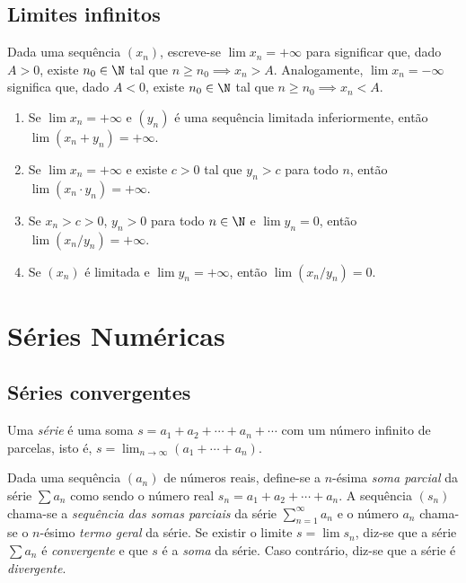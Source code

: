 \documentclass{article}
\begin{document}
\subsection{Limites infinitos}

\begin{defn}
    Dada uma sequência \((x_n)\), escreve-se \(\lim x_n = +\infty\) para significar que, dado \(A > 0\), existe \(n_0 \in \N\) tal que \(n \geq n_0 \implies x_n > A\).
    Analogamente, \(\lim x_n = -\infty\) significa que, dado \(A < 0\), existe \(n_0 \in \N\) tal que \(n \geq n_0 \implies x_n < A\).
\end{defn}

\begin{thm}
    \begin{enumerate}
        \item [(i)] Se \(\lim x_n = +\infty\) e \((y_n)\) é uma sequência limitada inferiormente, então \(\lim (x_n + y_n) = +\infty\).
        \item [(ii)] Se \(\lim x_n = +\infty\) e existe \(c > 0\) tal que \(y_n > c\) para todo \(n\), então \(\lim (x_n \cdot y_n) = +\infty\).
        \item [(iii)] Se \(x_n > c > 0\), \(y_n > 0\) para todo \(n \in \N\) e \(\lim y_n = 0\), então \(\lim (x_n / y_n) = +\infty\).
        \item [(iv)] Se \((x_n)\) é limitada e \(\lim y_n = +\infty\), então \(\lim (x_n / y_n) = 0\).
    \end{enumerate}
\end{thm}

\section{Séries Numéricas}

\subsection{Séries convergentes}

\begin{defn}
    Uma \emph{série} é uma soma \(s = a_1 + a_2 + \cdots + a_n + \cdots\) com um número infinito de parcelas, isto é, \(s = \lim_{n \to \infty} (a_1 + \cdots + a_n)\).
\end{defn}

\begin{defn}
    Dada uma sequência \((a_n)\) de números reais, define-se a \(n\)-ésima \emph{soma parcial} da série \(\sum a_n\) como sendo o número real \(s_n = a_1 + a_2 + \cdots + a_n\). A sequência \((s_n)\) chama-se a \emph{sequência das somas parciais} da série \(\sum_{n=1}^{\infty} a_n\) e o número \(a_n\) chama-se o \(n\)-ésimo \emph{termo geral} da série.
    Se existir o limite \(s = \lim s_n\), diz-se que a série \(\sum a_n\) é \emph{convergente} e que \(s\) é a \emph{soma} da série. Caso contrário, diz-se que a série é \emph{divergente}.
\end{defn}
\end{document}
